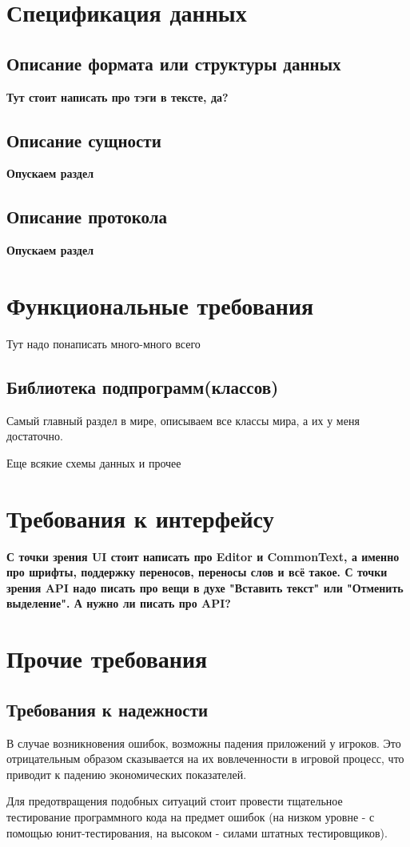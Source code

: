 \documentclass{fefu}
\begin{document}
	\section{Спецификация данных}
		\subsection{Описание формата или структуры данных}
			\textbf{Тут стоит написать про тэги в тексте, да?}
		\subsection{Описание сущности}
			\textbf{Опускаем раздел}
		\subsection{Описание протокола}
			\textbf{Опускаем раздел}
	\section{Функциональные требования}
		\par Тут надо понаписать много-много всего
		\subsection{Библиотека подпрограмм(классов)}
			\par Самый главный раздел в мире, описываем все классы мира, а их у меня 
			достаточно.
			\par Еще всякие схемы данных и прочее
	\section{Требования к интерфейсу}
		\textbf{С точки зрения UI стоит написать про Editor и CommonText, а именно про 
		шрифты, поддержку переносов, переносы слов и всё такое. С точки зрения API надо писать
		про вещи в духе "Вставить текст" или "Отменить выделение". А нужно ли писать про API?}
	\section{Прочие требования}
		\subsection{Требования к надежности}
			\par В случае возникновения ошибок, возможны падения приложений у игроков. Это 
			отрицательным образом сказывается на их вовлеченности в игровой процесс, что
			приводит к падению экономических показателей.
			\par Для предотвращения подобных ситуаций стоит провести тщательное тестирование
			программного кода на предмет ошибок (на низком уровне - с помощью 
			юнит-тестирования, на высоком - силами штатных тестировщиков).
\end{document}
